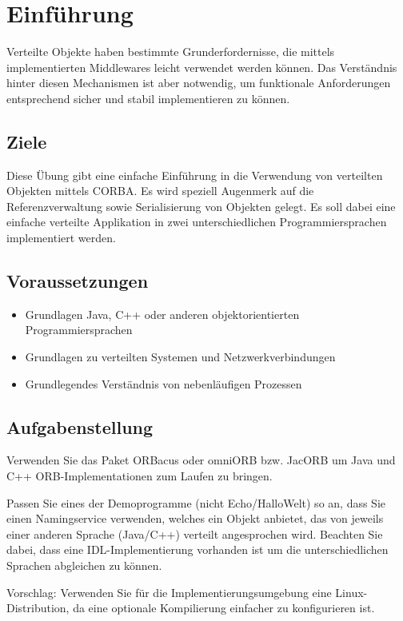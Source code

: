 
\section{Einführung}
Verteilte Objekte haben bestimmte Grunderfordernisse, die mittels implementierten Middlewares leicht verwendet werden können. Das Verständnis hinter diesen Mechanismen ist aber notwendig, um funktionale Anforderungen entsprechend sicher und stabil implementieren zu können.

\subsection{Ziele}
Diese Übung gibt eine einfache Einführung in die Verwendung von verteilten Objekten mittels CORBA. Es wird speziell Augenmerk auf die Referenzverwaltung sowie Serialisierung von Objekten gelegt. Es soll dabei eine einfache verteilte Applikation in zwei unterschiedlichen Programmiersprachen implementiert werden.

\subsection{Voraussetzungen}
\begin{itemize}
    \item Grundlagen Java, C++ oder anderen objektorientierten Programmiersprachen
    \item Grundlagen zu verteilten Systemen und Netzwerkverbindungen
    \item Grundlegendes Verst\"andnis von nebenl\"aufigen Prozessen
\end{itemize}

\subsection{Aufgabenstellung}
Verwenden Sie das Paket ORBacus oder omniORB bzw. JacORB um Java und C++ ORB-Implementationen zum Laufen zu bringen.

Passen Sie eines der Demoprogramme (nicht Echo/HalloWelt) so an, dass Sie einen Namingservice verwenden, welches ein Objekt anbietet, das von jeweils einer anderen Sprache (Java/C++) verteilt angesprochen wird. Beachten Sie dabei, dass eine IDL-Implementierung vorhanden ist um die unterschiedlichen Sprachen abgleichen zu können.

Vorschlag: Verwenden Sie für die Implementierungsumgebung eine Linux-Distribution, da eine optionale Kompilierung einfacher zu konfigurieren ist.
\clearpage
